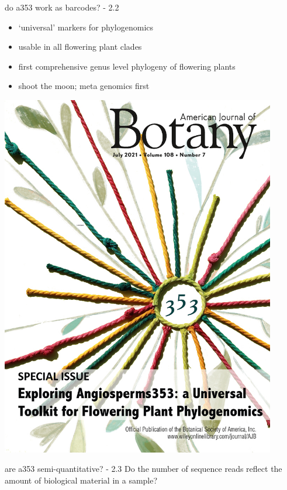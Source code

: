 \documentclass[
  ignorenonframetext,
]{beamer}
\providecommand{\tightlist}{%
  \setlength{\itemsep}{0pt}\setlength{\parskip}{0pt}}
\begin{document}
\begin{frame}{do a353 work as barcodes? - 2.2}
\protect\hypertarget{do-a353-work-as-barcodes---2.2}{}
\begin{itemize}
\tightlist
\item
  `universal' markers for phylogenomics
\item
  usable in all flowering plant clades
\item
  first comprehensive genus level phylogeny of flowering plants
\item
  shoot the moon; meta genomics first
\end{itemize}

\includegraphics[width=0.9\textwidth,height=\textheight]{../graphics/pictures/Angiosperms353.jpg}
\end{frame}

\begin{frame}{are a353 semi-quantitative? - 2.3}
\protect\hypertarget{are-a353-semi-quantitative---2.3}{}
Do the number of sequence reads reflect the amount of biological
material in a sample?
\end{frame}
\end{document}
